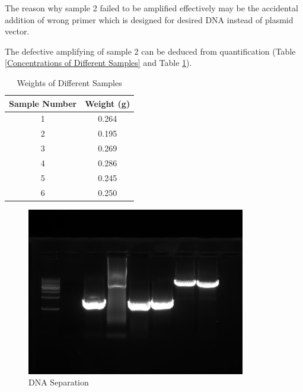 \documentclass{article}
\begin{document}
The reason why sample 2 failed to be amplified effectively may be the accidental addition of wrong primer which is designed for desired DNA instead of plasmid vector. 

The defective amplifying of sample 2 can be deduced from quantification (Table \ref{Concentrations of Different Samples} and Table \ref{Weights of Different Samples}).

\begin{table}
    \centering
    \begin{tabular}{|c|c|} \hline 
         Sample Number& Weight (g)\\ \hline 
         1& 0.264\\ \hline 
         2& 0.195\\ \hline 
         3& 0.269\\ \hline 
         4& 0.286\\ \hline 
         5& 0.245\\ \hline 
         6& 0.250\\ \hline
    \end{tabular}
    \caption{Weights of Different Samples}
    \label{Weights of Different Samples}
\end{table}

\begin{figure}
    \centering
    \includegraphics[width=0.75\linewidth]{../Figures/DNA Separation.png}
    \caption{DNA Separation}
    \label{DNA Separation}
\end{figure}
\end{document}
